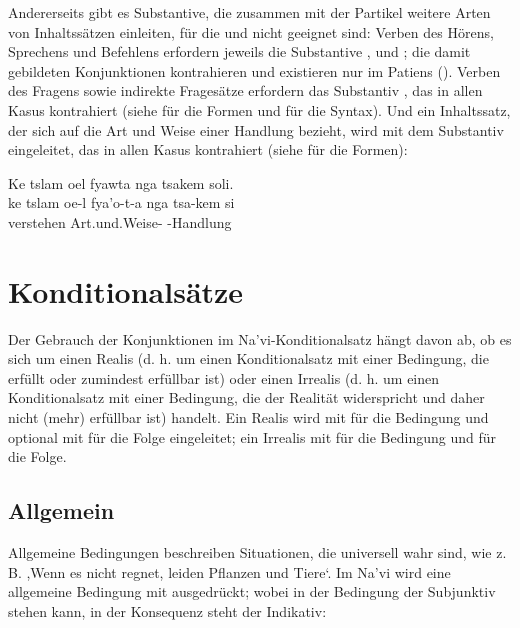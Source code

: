 \noindent Andererseits gibt es Substantive, die zusammen mit der Partikel  weitere Arten von Inhaltssätzen einleiten, für die  und  nicht geeignet sind: Verben des Hörens, Sprechens und Befehlens erfordern jeweils die Substantive  ,   und  ; die damit gebildeten Konjunktionen kontrahieren und existieren nur im Patiens (). Verben des Fragens sowie indirekte Fragesätze erfordern das Substantiv  , das in allen Kasus kontrahiert (siehe  für die Formen und  für die Syntax). Und ein Inhaltssatz, der sich auf die Art und Weise einer Handlung bezieht, wird mit dem Substantiv   eingeleitet, das in allen Kasus kontrahiert (siehe  für die Formen):

\begin{interlin}
	\glll \Npawl{}Ke tslam oel fyawta nga tsakem soli. \\
	ke tslam oe-l fya'o-t-a nga tsa-kem si \\
	 verstehen  Art.und.Weise-  -Handlung  \\
\end{interlin}

\section{Konditionalsätze}
\noindent Der Gebrauch der Konjunktionen im Na'vi-Konditionalsatz hängt davon ab, ob es sich um einen Realis (d. h. um einen Konditionalsatz mit einer Bedingung, die erfüllt oder zumindest erfüllbar ist) oder einen Irrealis (d. h. um einen Konditionalsatz mit einer Bedingung, die der Realität widerspricht und daher nicht (mehr) erfüllbar ist) handelt. Ein Realis wird mit   für die Bedingung und optional mit   für die Folge eingeleitet; ein Irrealis mit   für die Bedingung und   für die Folge.
\label{syn:conditionals}

\subsection{Allgemein} Allgemeine Bedingungen beschreiben Situationen, die universell wahr sind, wie z. B. ,Wenn es nicht regnet, leiden Pflanzen und Tiere‘. Im Na'vi wird eine allgemeine Bedingung mit  ausgedrückt; wobei in der Bedingung  der Subjunktiv stehen kann, in der Konsequenz steht der Indikativ:

